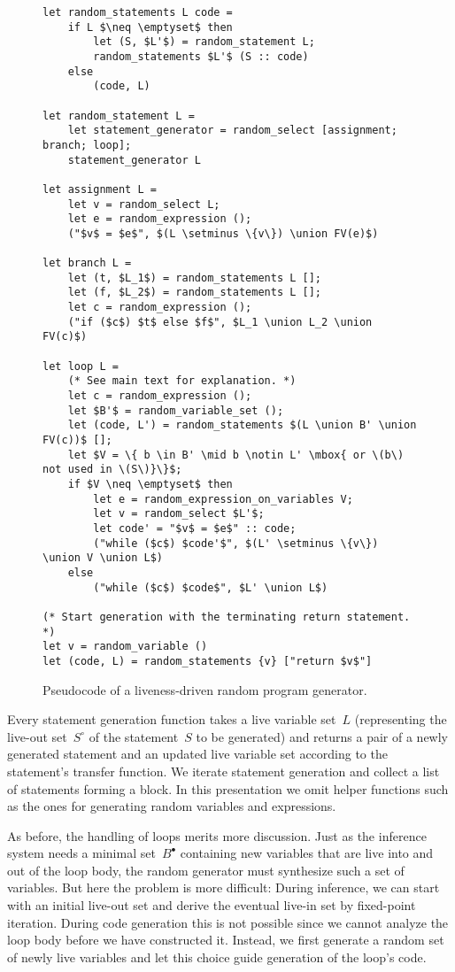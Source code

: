 \documentclass{llncs}
\newcommand{\liveout}[1]{\ensuremath{#1^{\circ}}}
\newcommand{\livein}[1]{\ensuremath{#1^{\bullet}}}
\def\union{\cup}
\begin{document}
\begin{figure}
\begin{lstlisting}
let random_statements L code =
    if L $\neq \emptyset$ then
        let (S, $L'$) = random_statement L;
        random_statements $L'$ (S :: code)
    else
        (code, L)

let random_statement L =
    let statement_generator = random_select [assignment; branch; loop];
    statement_generator L

let assignment L =
    let v = random_select L;
    let e = random_expression ();
    ("$v$ = $e$", $(L \setminus \{v\}) \union FV(e)$)

let branch L =
    let (t, $L_1$) = random_statements L [];
    let (f, $L_2$) = random_statements L [];
    let c = random_expression ();
    ("if ($c$) $t$ else $f$", $L_1 \union L_2 \union FV(c)$)

let loop L =
    (* See main text for explanation. *)
    let c = random_expression ();
    let $B'$ = random_variable_set ();
    let (code, L') = random_statements $(L \union B' \union FV(c))$ [];
    let $V = \{ b \in B' \mid b \notin L' \mbox{ or \(b\) not used in \(S\)}\}$;
    if $V \neq \emptyset$ then
        let e = random_expression_on_variables V;
        let v = random_select $L'$;
        let code' = "$v$ = $e$" :: code;
        ("while ($c$) $code'$", $(L' \setminus \{v\}) \union V \union L$)
    else
        ("while ($c$) $code$", $L' \union L$)

(* Start generation with the terminating return statement. *)
let v = random_variable ()
let (code, L) = random_statements {v} ["return $v$"]
\end{lstlisting}
\caption{Pseudocode of a liveness-driven random program generator.}
\label{fig:generator}
\end{figure}

Every statement generation function takes a live variable set~\(L\)
(representing the live-out set~\(\liveout{S}\) of the statement~\(S\) to be
generated) and returns a pair of a newly generated statement and an updated
live variable set according to the statement's transfer function. We iterate
statement generation and collect a list of statements forming a block. In
this presentation we omit helper functions such as the ones for generating
random variables and expressions.

As before, the handling of loops merits more discussion. Just as the
inference system needs a minimal set~\(\livein{B}\) containing new variables
that are live into and out of the loop body, the random generator must
synthesize such a set of variables. But here the problem is more difficult:
During inference, we can start with an initial live-out set and derive the
eventual live-in set by fixed-point iteration. During code generation this
is not possible since we cannot analyze the loop body before we have
constructed it. Instead, we first generate a random set of newly live
variables and let this choice guide generation of the loop's code.
\end{document}
